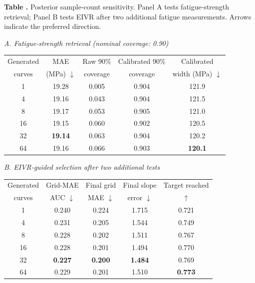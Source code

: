 \noindent
\begin{minipage}{\columnwidth}
\centering
{}\label{tab:downstream_ensemble}
\footnotesize\textbf{Table \thetable.} Posterior sample-count sensitivity. Panel A tests fatigue-strength retrieval; Panel B tests EIVR after two additional fatigue measurements. Arrows indicate the preferred direction.
\smallskip

\scriptsize
\textit{A. Fatigue-strength retrieval (nominal coverage: 0.90)}
\smallskip

\setlength{\tabcolsep}{5.0pt}
\begin{tabular}{ccccc}
\toprule
Generated & MAE & Raw 90\% & Calibrated 90\% & Calibrated \\
curves & (MPa) $\downarrow$ & coverage & coverage & width (MPa) $\downarrow$ \\
\midrule
1  & 19.28 & 0.005 & 0.904 & 121.9 \\
4  & 19.16 & 0.043 & 0.904 & 121.5 \\
8  & 19.17 & 0.053 & 0.905 & 121.0 \\
16 & 19.15 & 0.060 & 0.902 & 120.5 \\
32 & \textbf{19.14} & 0.063 & 0.904 & 120.2 \\
64 & 19.16 & 0.066 & 0.903 & \textbf{120.1} \\
\bottomrule
\end{tabular}

\medskip
\textit{B. EIVR-guided selection after two additional tests}
\smallskip

\begin{tabular}{ccccc}
\toprule
Generated & Grid-MAE & Final grid & Final slope & Target reached \\
curves & AUC $\downarrow$ & MAE $\downarrow$ & error $\downarrow$ & $\uparrow$ \\
\midrule
1  & 0.240 & 0.224 & 1.715 & 0.721 \\
4  & 0.231 & 0.205 & 1.544 & 0.749 \\
8  & 0.228 & 0.202 & 1.511 & 0.767 \\
16 & 0.228 & 0.201 & 1.494 & 0.770 \\
32 & \textbf{0.227} & \textbf{0.200} & \textbf{1.484} & 0.769 \\
64 & 0.229 & 0.201 & 1.510 & \textbf{0.773} \\
\bottomrule
\end{tabular}
\end{minipage}
